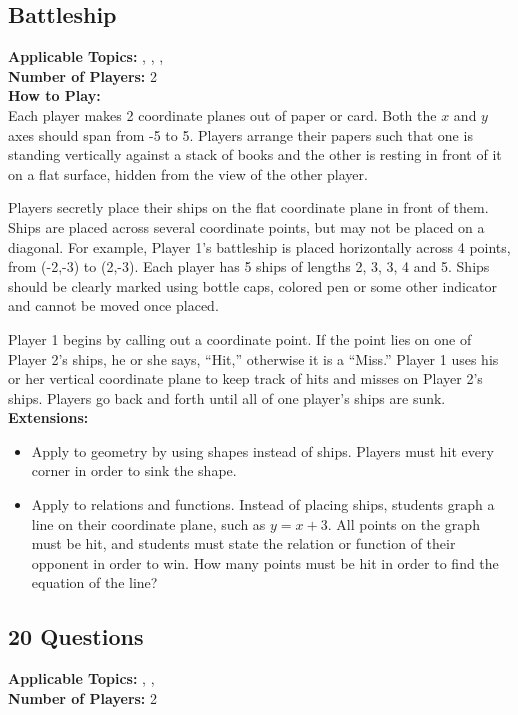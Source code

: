 	\subsection{Battleship} \label{battleship}
	\textbf{Applicable Topics:} , , , \\	
	\textbf{Number of Players:} 2\\
	
	\noindent \textbf{How to Play:}\\
	Each player makes 2 coordinate planes out of paper or card. Both the $x$ and $y$ axes should span from -5 to 5. Players arrange their papers such that one is standing vertically against a stack of books and the other is resting in front of it on a flat surface, hidden from the view of the other player.
	
	Players secretly place their ships on the flat coordinate plane in front of them. Ships are placed across several coordinate points, but may not be placed on a diagonal. For example, Player 1's battleship is placed horizontally across 4 points, from (-2,-3) to (2,-3). Each player has 5 ships of lengths 2, 3, 3, 4 and 5. Ships should be clearly marked using bottle caps, colored pen or some other indicator and cannot be moved once placed.
	
	Player 1 begins by calling out a coordinate point. If the point lies on one of Player 2's ships, he or she says, ``Hit,'' otherwise it is a ``Miss.'' Player 1 uses his or her vertical coordinate  plane to keep track of hits and misses on Player 2's ships. Players go back and forth until all of one player's ships are sunk.\\
	
	\noindent \textbf{Extensions:}
	\begin{itemize}
	\item Apply to geometry by using shapes instead of ships. Players must hit every corner in order to sink the shape.
	\item Apply to relations and functions. Instead of placing ships, students graph a line on their coordinate plane, such as $y = x + 3$. All points on the graph must be hit, and students must state the relation or function of their opponent in order to win. How many points must be hit in order to find the equation of the line?
	\end{itemize}
	
	\subsection{20 Questions} \label{20questions}
	\textbf{Applicable Topics:} , , \\	
	\textbf{Number of Players:} 2\\
	
